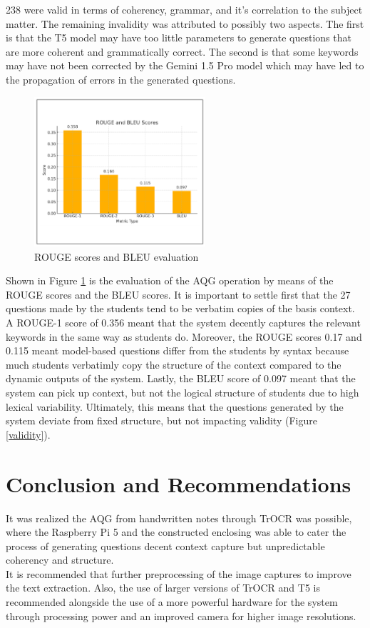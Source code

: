 \documentclass[conference]{IEEEtran}
\begin{document}
238 were valid in terms of coherency, grammar, and it's correlation 
to the subject matter. The remaining invalidity was attributed to 
possibly two aspects. The first is that the T5 model may have too little 
parameters to generate questions that are more coherent and 
grammatically correct. The second is that some keywords may have not been 
corrected by the Gemini 1.5 Pro model which may have led to the
propagation of errors in the generated questions.
\newpage
\begin{figure}[H]
    \centerline{\includegraphics[width=2.5in]{eval.png}}
    \vspace{-0.5cm}
    \caption{ROUGE scores and BLEU evaluation} 
    \label{eval}
    \end{figure}
\vspace{-0.3cm}
Shown in Figure \ref{eval} is the evaluation of the AQG operation by means
of the ROUGE scores and the BLEU scores. 
It is important to settle first that the 27 questions made by the 
students tend to be verbatim copies of the basis context. 
A ROUGE-1 score of 0.356 meant that the system decently captures 
the relevant keywords in the same way as students do. 
Moreover, the ROUGE scores 0.17
and 0.115 meant model-based questions differ from the 
students by syntax
because much students verbatimly copy 
the structure of the context compared to the dynamic outputs 
of the system. Lastly, the BLEU score of 0.097 meant that 
the system can pick up context, but not the logical structure 
of students due to high lexical variability. Ultimately, this means 
that the questions generated by the system deviate from fixed structure, 
but not impacting validity (Figure \ref{validity}).

\section{Conclusion and Recommendations}
\indent It was realized the AQG from handwritten notes 
through TrOCR was possible, where the Raspberry Pi 5 
and the constructed enclosing
was able to cater the process of generating
questions decent context capture but unpredictable coherency and 
structure. \\
\indent It is recommended that further preprocessing of the image 
captures to improve the text extraction. Also, 
the use of larger versions of TrOCR and T5 is recommended 
alongside the use of a more powerful hardware for the system
through processing power and an improved camera for 
higher image resolutions.
\end{document}
